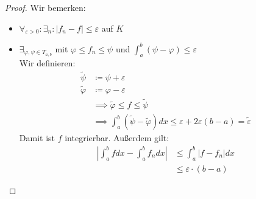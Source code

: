 \begin{proof}
Wir bemerken:
\begin{itemize}
	\item $\forall_{\varepsilon>0}: \exists_{n}: |f_n-f| \le \varepsilon$ auf $K$
	\item $\exists_{\varphi, \psi \in T_{a,b}} $ mit $\varphi \le f_n \le \psi$ und $\int_a^b(\psi - \varphi) \le \varepsilon$ \\
		Wir definieren:
		\begin{align*}
			\tilde{\psi} &\coloneqq \psi + \varepsilon \\
			\tilde{\varphi} &\coloneqq \varphi - \varepsilon \\
					&\implies \tilde{\varphi} \le f \le \tilde{\psi} \\
					&\implies \int_a^b(\tilde{\psi} - \tilde{\varphi})dx \le \varepsilon + 2 \varepsilon(b-a) = \tilde{\varepsilon}
		\end{align*}
Damit ist $f$ integrierbar.
Außerdem gilt: 
\begin{align*}
	\left| \int_a^b f dx - \int_a^b f_n dx \right| &\le \int_a^b |f-f_n| dx \\
						       &\le \varepsilon \cdot (b-a)
\end{align*}		
\end{itemize}
\end{proof}

